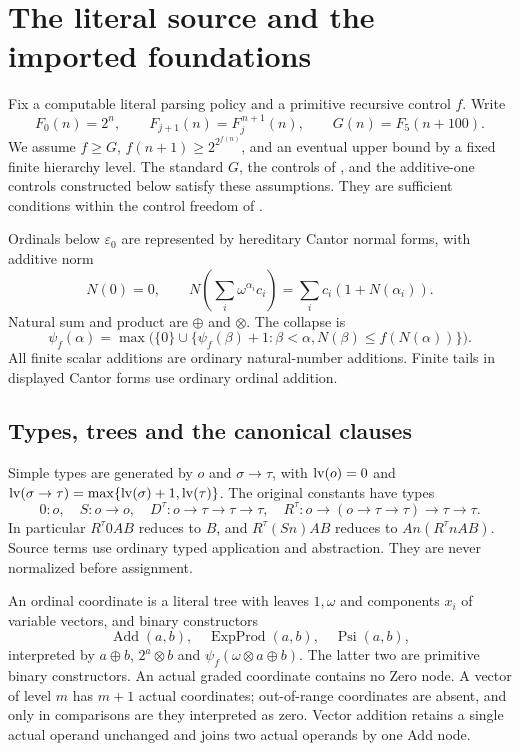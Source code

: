 \section{The literal source and the imported foundations}\label{sec:setting}

Fix a computable literal parsing policy and a primitive recursive
control $f$. Write
\[
 F_0(n)=2^n,\qquad F_{j+1}(n)=F_j^{\,n+1}(n),\qquad
 G(n)=F_5(n+100).
\]
We assume $f\ge G$, $f(n+1)\ge2^{2^{f(n)}}$, and an eventual
upper bound by a fixed finite hierarchy level. The standard $G$, the
controls of \cite{groundcomparison}, and the additive-one controls
constructed below satisfy these assumptions. They are sufficient
conditions within the control freedom of \cite[Section~2.1]{ww}.

Ordinals below $\varepsilon_0$ are represented by hereditary Cantor
normal forms, with additive norm
\[
 N(0)=0,\qquad
 N\left(\sum_i\omega^{\alpha_i}c_i\right)
       =\sum_i c_i(1+N(\alpha_i)).
\]
Natural sum and product are $\oplus$ and $\otimes$.
The collapse is
\[
 \psi_f(\alpha)=\max\bigl(\{0\}\cup
 \{\psi_f(\beta)+1:\beta<\alpha,
                       N(\beta)\le f(N(\alpha))\}\bigr).
\]
All finite scalar additions are ordinary natural-number additions.
Finite tails in displayed Cantor forms use ordinary ordinal addition.

\subsection{Types, trees and the canonical clauses}

Simple types are generated by $o$ and $\sigma\to\tau$, with
$\operatorname{lv}(o)=0$ and
$\operatorname{lv}(\sigma\to\tau)=\max\{\operatorname{lv}(\sigma)+1,\operatorname{lv}(\tau)\}$.
The original constants have types
\[
 0:o,\quad S:o\to o,\quad D^\tau:o\to\tau\to\tau\to\tau,
 \quad R^\tau:o\to(o\to\tau\to\tau)\to\tau\to\tau.
\]
In particular $R^\tau0AB$ reduces to $B$, and
$R^\tau(Sn)AB$ reduces to $An(R^\tau nAB)$. Source terms use
ordinary typed application and abstraction. They are never normalized
before assignment.

An ordinal coordinate is a literal tree with leaves $1,\omega$ and
components $x_i$ of variable vectors, and binary constructors
\[
 \operatorname{Add}(a,b),\quad\operatorname{ExpProd}(a,b),
 \quad\operatorname{Psi}(a,b),
\]
interpreted by $a\oplus b$, $2^a\otimes b$ and
$\psi_f(\omega\otimes a\oplus b)$. The latter two are
primitive binary constructors. An actual graded coordinate contains
no Zero node. A vector of level $m$ has $m+1$ actual coordinates;
out-of-range coordinates are absent, and only in comparisons are they
interpreted as zero. Vector addition retains a single actual operand
unchanged and joins two actual operands by one Add node.


